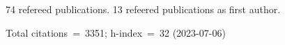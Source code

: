 74 refereed publications. 13 refeered publications as first author.

Total citations~=~3351; h-index~=~32 (2023-07-06)